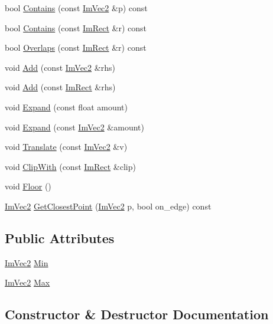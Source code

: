 \begin{DoxyCompactItemize}
bool \hyperlink{struct_im_rect_ac583156fd0e9306181fff5d120b262ea}{Contains} (const \hyperlink{struct_im_vec2}{Im\+Vec2} \&p) const
\item 
bool \hyperlink{struct_im_rect_ad6043344d8ac30d5f342c71641cfe24b}{Contains} (const \hyperlink{struct_im_rect}{Im\+Rect} \&r) const
\item 
bool \hyperlink{struct_im_rect_a0af3bade3781e5e7c6afdf71ccfb0d43}{Overlaps} (const \hyperlink{struct_im_rect}{Im\+Rect} \&r) const
\item 
void \hyperlink{struct_im_rect_a9d6cbef8c86ca01a16bb0fd35b457f88}{Add} (const \hyperlink{struct_im_vec2}{Im\+Vec2} \&rhs)
\item 
void \hyperlink{struct_im_rect_a9bcb65fd17843c74555291a522e9ebdf}{Add} (const \hyperlink{struct_im_rect}{Im\+Rect} \&rhs)
\item 
void \hyperlink{struct_im_rect_af33a7424c3341d08acd69da30c27c753}{Expand} (const float amount)
\item 
void \hyperlink{struct_im_rect_ac0b0b88fe65725b4694cd7d91d42d382}{Expand} (const \hyperlink{struct_im_vec2}{Im\+Vec2} \&amount)
\item 
void \hyperlink{struct_im_rect_ae964217d0317002b1ae80f935c97e689}{Translate} (const \hyperlink{struct_im_vec2}{Im\+Vec2} \&v)
\item 
void \hyperlink{struct_im_rect_a5e220ababe2fa079638aab8f4b0b8ace}{Clip\+With} (const \hyperlink{struct_im_rect}{Im\+Rect} \&clip)
\item 
void \hyperlink{struct_im_rect_a8fdf75a0c64ff29f65113cd9f8be77ab}{Floor} ()
\item 
\hyperlink{struct_im_vec2}{Im\+Vec2} \hyperlink{struct_im_rect_a223c67d4c93e5c87a33a68ebb527bbb8}{Get\+Closest\+Point} (\hyperlink{struct_im_vec2}{Im\+Vec2} p, bool on\+\_\+edge) const
\end{DoxyCompactItemize}
\subsection*{Public Attributes}
\begin{DoxyCompactItemize}
\item 
\hyperlink{struct_im_vec2}{Im\+Vec2} \hyperlink{struct_im_rect_af8f3fbf7ec983e03548b88e14ba68aa8}{Min}
\item 
\hyperlink{struct_im_vec2}{Im\+Vec2} \hyperlink{struct_im_rect_aad58c13340d320b350a72a037e3f7628}{Max}
\end{DoxyCompactItemize}


\subsection{Constructor \& Destructor Documentation}
\hypertarget{struct_im_rect_a57399f36758ed3eb1eb762143401ff54}{}\label{struct_im_rect_a57399f36758ed3eb1eb762143401ff54} 

